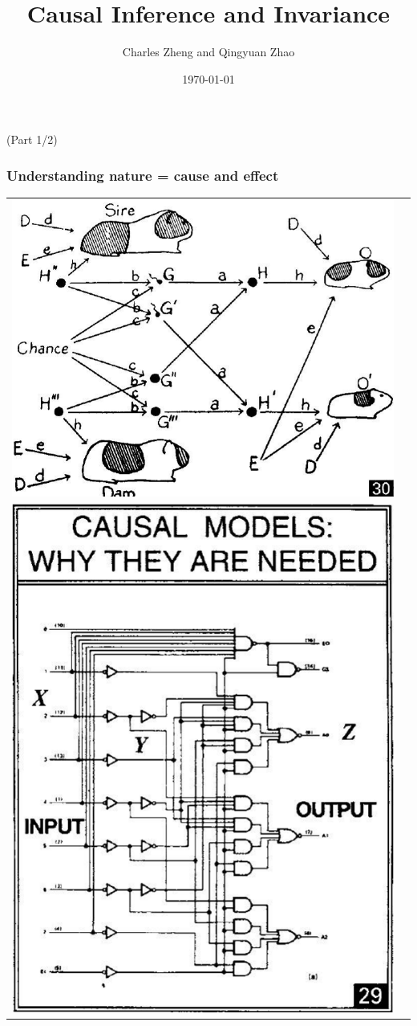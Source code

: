 \documentclass{beamer}
\title[Informal]{Causal Inference and Invariance}
\author{Charles Zheng and Qingyuan Zhao}
\institute[Stanford]
{Stanford University}
\date{\today}
\begin{document}
\begin{frame}
\titlepage
(Part 1/2)
\end{frame}

\begin{frame}
\frametitle{Understanding nature = cause and effect}
\begin{tabular}{cc}
\includegraphics[scale=0.13]{../images/pearl30.png}& \\
\includegraphics[scale=0.17]{../images/pearl29.png} &

\end{tabular}
\end{frame}
\end{document}
